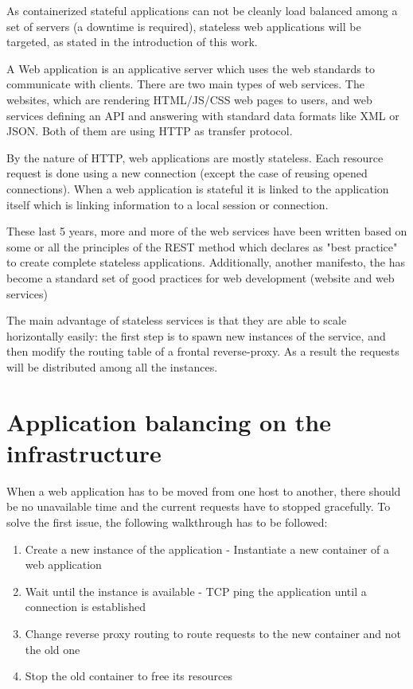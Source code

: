 As containerized stateful applications can not be cleanly load balanced among a
set of servers (a downtime is required), stateless web applications will be
targeted, as stated in the introduction of this work.

A Web application is an applicative server which uses the web standards to
communicate with clients. There are two main types of web services. The
websites, which are rendering HTML/JS/CSS web pages to users, and web services
defining an API and answering with standard data formats like XML or JSON. Both
of them are using HTTP as transfer protocol.

By the nature of HTTP, web applications are mostly stateless. Each resource
request is done using a new connection (except the case of reusing opened
connections). When a web application is stateful it is linked to the
application itself which is linking information to a local session or
connection.

These last 5 years, more and more of the web services have been written based
on some or all the principles of the REST method which declares as "best
practice" to create complete stateless applications. Additionally, another
manifesto, the \cite{website12Factors} has become a standard set of good
practices for web development (website and web services)

The main advantage of stateless services is that they are able to scale
horizontally easily: the first step is to spawn new instances of the service,
and then modify the routing table of a frontal reverse-proxy. As a result the
requests will be distributed among all the instances.

\section{Application balancing on the infrastructure}

When a web application has to be moved from one host to another, there should
be no unavailable time and the current requests have to stopped gracefully. To
solve the first issue, the following walkthrough has to be followed:

\begin{enumerate}
	\item{Create a new instance of the application - Instantiate a new
	container of a web application}
	\item{Wait until the instance is available - TCP ping the application
	until a connection is established}
	\item{Change reverse proxy routing to route requests to the new
	container and not the old one}
	\item{Stop the old container to free its resources}
\end{enumerate}

